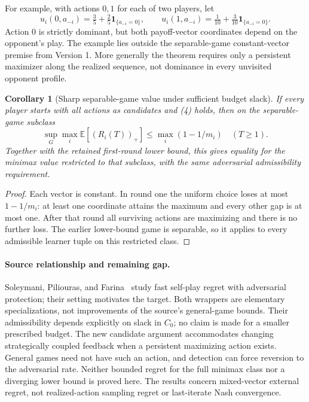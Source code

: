 \documentclass[11pt]{article}
\newtheorem{corollary}{Corollary}
\theoremstyle{definition}
\theoremstyle{remark}
\begin{document}
For example, with actions $0,1$ for each of two players, let
\[
 u_i(0,a_{-i})=\tfrac35+\tfrac25\mathbf1_{\{a_{-i}=0\}},
 \qquad
 u_i(1,a_{-i})=\tfrac1{10}+\tfrac3{10}\mathbf1_{\{a_{-i}=0\}}.
\]
Action $0$ is strictly dominant, but both payoff-vector coordinates depend
on the opponent's play. The example lies outside the separable-game
constant-vector premise from Version 1. More generally the theorem requires
only a persistent maximizer along the realized sequence, not dominance in
every unvisited opponent profile.

\begin{corollary}[Sharp separable-game value under sufficient budget slack]
If every player starts with all actions as candidates and (4) holds, then
on the separable-game subclass
\[
 \sup_G\max_i\mathbb E[(R_i(T))_+]
 \leq \max_i(1-1/m_i)
 \quad(T\geq1).
\]
Together with the retained first-round lower bound, this gives equality for
the minimax value restricted to that subclass, with the same adversarial
admissibility requirement.
\end{corollary}
\begin{proof}
Each vector is constant. In round one the uniform choice loses at most
$1-1/m_i$: at least one coordinate attains the maximum and every other gap
is at most one. After that round all surviving actions are maximizing and
there is no further loss. The earlier lower-bound game is separable, so it
applies to every admissible learner tuple on this restricted class.
\end{proof}

\paragraph{Source relationship and remaining gap.}
Soleymani, Piliouras, and Farina~\cite{source} study fast self-play regret with adversarial protection; their setting motivates the target. Both wrappers are elementary specializations, not improvements of the
source's general-game bounds. Their admissibility depends explicitly on
slack in $C_0$; no claim is made for a smaller prescribed budget. The new
candidate argument accommodates changing strategically coupled feedback
when a persistent maximizing action exists. General games need not have
such an action, and detection can force reversion to the adversarial rate.
Neither bounded regret for the full minimax class nor a diverging lower
bound is proved here. The results concern mixed-vector external regret,
not realized-action sampling regret or last-iterate Nash convergence.
\end{document}
